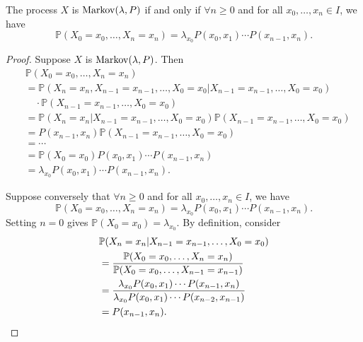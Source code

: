 \documentclass[a4paper]{article}
\begin{document}
\begin{theorem}\label{thm:1.1}
    The process $X$ is $ \operatorname{Markov}(\lambda,P) $ if and only if $ \forall n\ge 0 $ and for all $ x_0,\dots,x_n\in I $, we have 
    \[
        \mathbb{P}(X_0=x_0,\dots,X_n=x_n) = \lambda_{x_0} P(x_0,x_1)\cdots P(x_{n-1},x_n).
    \]
\end{theorem}
\begin{proof}
    Suppose $ X $ is $ \operatorname{Markov}(\lambda,P) $. Then 
    \begin{align*}
        &\mathbb{P}(X_0=x_0,\dots,X_n=x_n)\\ &= \mathbb{P}(X_n=x_n,X_{n-1}=x_{n-1},\dots, X_0=x_0|X_{n-1}=x_{n-1},\dots, X_0=x_0)\\
        &\quad\cdot \mathbb{P}(X_{n-1}=x_{n-1},\dots, X_0=x_0 )\\
        &= \mathbb{P}(X_n=x_n|X_{n-1}=x_{n-1},\dots, X_0=x_0)\mathbb{P}(X_{n-1}=x_{n-1},\dots, X_0=x_0 )\\ 
        &= P(x_{n-1},x_n)\mathbb{P}(X_{n-1}=x_{n-1},\dots, X_0=x_0 )\\ 
        &=\cdots\\ 
        &= \mathbb{P}(X_0=x_0) P(x_0,x_1)\cdots P(x_{n-1},x_n)\\ 
        &= \lambda_{x_0} P(x_0,x_1)\cdots P(x_{n-1},x_n).
    \end{align*}

    Suppose conversely that $ \forall n\ge 0 $ and for all $ x_0,\dots,x_n\in I $, we have 
    \[
        \mathbb{P}(X_0=x_0,\dots,X_n=x_n) = \lambda_{x_0} P(x_0,x_1)\cdots P(x_{n-1},x_n).
    \]
    Setting $n=0$ gives $ \mathbb{P}(X_0=x_0)=\lambda_{x_0} $. By definition, consider 
    \begin{align*}
        &\mathbb{P}(X_n=x_n|X_{n-1}=x_{n-1},\dots, X_0=x_0)\\ &= \frac{\mathbb{P}(X_0=x_0,\dots,X_n=x_n)}{\mathbb{P}(X_0=x_0,\dots,X_{n-1}=x_{n-1})}\\ 
        &= \frac{\lambda_{x_0} P(x_0,x_1)\cdots P(x_{n-1},x_n)}{\lambda_{x_0} P(x_0,x_1)\cdots P(x_{n-2},x_{n-1})}\\ 
        &= P(x_{n-1},x_n).\qedhere
    \end{align*}
\end{proof}
\end{document}
